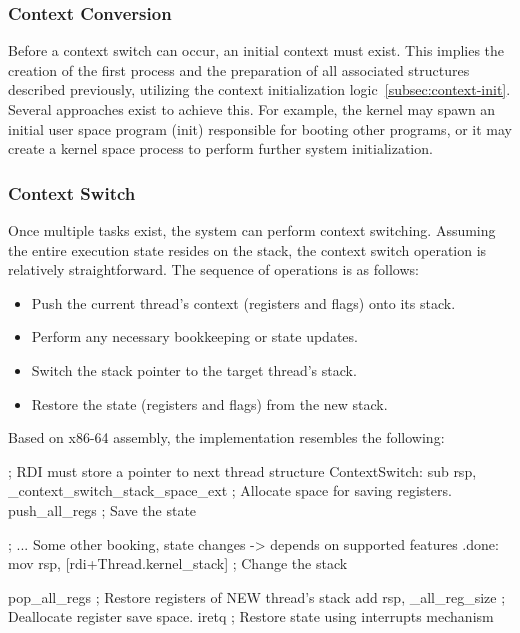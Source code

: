 \documentclass[a4paper,10pt,twoside]{report}
\theoremstyle{definition}
\begin{document}
\subsubsection{Context Conversion}

Before a context switch can occur, an initial context must exist. This implies the creation of the first process and the preparation of all associated structures described previously, utilizing the context initialization logic~\ref{subsec:context-init}. Several approaches exist to achieve this. For example, the kernel may spawn an initial user space program (init) responsible for booting other programs, or it may create a kernel space process to perform further system initialization.

\subsubsection{Context Switch}

Once multiple tasks exist, the system can perform context switching. Assuming the entire execution state resides on the stack, the context switch operation is relatively straightforward. The sequence of operations is as follows:

\begin{itemize}
    \item Push the current thread's context (registers and flags) onto its stack.
    \item Perform any necessary bookkeeping or state updates.
    \item Switch the stack pointer to the target thread's stack.
    \item Restore the state (registers and flags) from the new stack.
\end{itemize}

\noindent Based on x86-64 assembly, the implementation resembles the following:
\begin{nasmcode}[caption={Context Switch Pseudocode}, label={lst:context_switch_example}]
; RDI must store a pointer to next thread structure
ContextSwitch:
    sub rsp, _context_switch_stack_space_ext     ; Allocate space for saving registers.
    push_all_regs                                ; Save the state

    ; ... Some other booking, state changes -> depends on supported features
.done:
    mov rsp, [rdi+Thread.kernel_stack]   ; Change the stack

    pop_all_regs            ; Restore registers of NEW thread's stack
    add rsp, _all_reg_size  ; Deallocate register save space.
    iretq                   ; Restore state using interrupts mechanism
\end{nasmcode}
\end{document}
